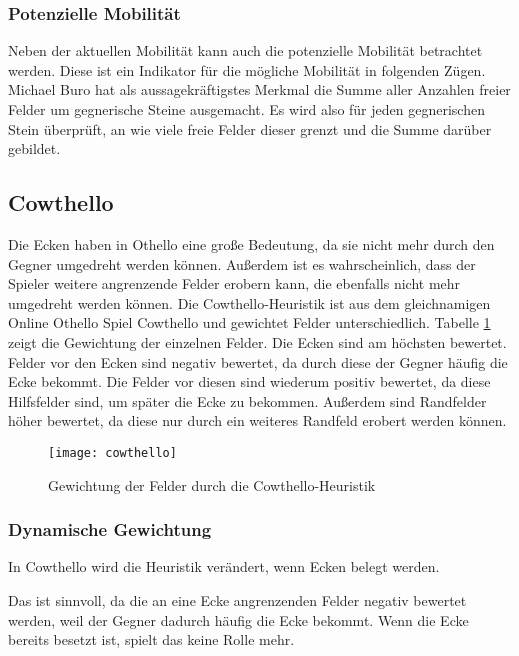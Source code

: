 \subsubsection{Potenzielle Mobilität}
\label{sec:potmobility}
Neben der aktuellen Mobilität kann auch die potenzielle Mobilität betrachtet werden. Diese ist ein Indikator für die
mögliche Mobilität in folgenden Zügen. Michael Buro hat als aussagekräftigstes Merkmal die Summe aller Anzahlen freier
Felder um gegnerische Steine ausgemacht. Es wird also für jeden gegnerischen Stein überprüft, an wie viele freie Felder
dieser grenzt und die Summe darüber gebildet.
\cite[S. 8f.]{evaluationfunctions}

\subsection{Cowthello}
\label{sec:cowthello}
Die Ecken haben in Othello eine große Bedeutung, da sie nicht mehr durch den Gegner umgedreht werden können. Außerdem
ist es wahrscheinlich, dass der Spieler weitere angrenzende Felder erobern kann, die ebenfalls nicht mehr umgedreht
werden können. Die Cowthello-Heuristik ist aus dem gleichnamigen Online Othello Spiel Cowthello und gewichtet Felder
unterschiedlich.
\cite{cowthello}
Tabelle \ref{fig:cowthello} zeigt die Gewichtung der einzelnen Felder. Die Ecken sind am höchsten bewertet. Felder vor
den Ecken sind negativ bewertet, da durch diese der Gegner häufig die Ecke bekommt. Die Felder vor diesen sind wiederum
positiv bewertet, da diese Hilfsfelder sind, um später die Ecke zu bekommen. Außerdem sind Randfelder höher bewertet, da
diese nur durch ein weiteres Randfeld erobert werden können.

\begin{figure}[H]
    \centering
    \texttt{[image: cowthello]}
    \caption{Gewichtung der Felder durch die Cowthello-Heuristik}
    \label{fig:cowthello}
\end{figure}

\subsubsection{Dynamische Gewichtung}
In Cowthello wird die Heuristik verändert, wenn Ecken belegt werden.
\cite{cowthello}

Das ist sinnvoll, da die an eine Ecke angrenzenden Felder negativ bewertet werden, weil der Gegner dadurch häufig die
Ecke bekommt. Wenn die Ecke bereits besetzt ist, spielt das keine Rolle mehr.%
